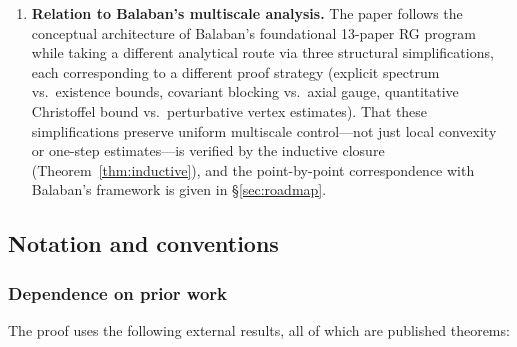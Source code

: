 \documentclass[11pt]{article}
\theoremstyle{definition}
\begin{document}
\begin{enumerate}[label=\textbf{(\arabic*)}]
\item \textbf{Relation to Balaban's
multiscale analysis.}
The paper follows the conceptual architecture of
Balaban's foundational 13-paper RG program while
taking a different analytical route via
three structural simplifications, each
corresponding to a different proof strategy
(explicit spectrum vs.\ existence bounds, covariant
blocking vs.\ axial gauge, quantitative Christoffel
bound vs.\ perturbative vertex estimates).
That these simplifications preserve uniform multiscale
control---not just local convexity or one-step
estimates---is verified by the inductive closure
(Theorem~\ref{thm:inductive}), and the point-by-point
correspondence with Balaban's framework is given in
\S\ref{sec:roadmap}.
\end{enumerate}

\subsection{Notation and conventions}

\subsubsection*{Dependence on prior work}

The proof uses the following external results, all of which are
published theorems:
\end{document}
